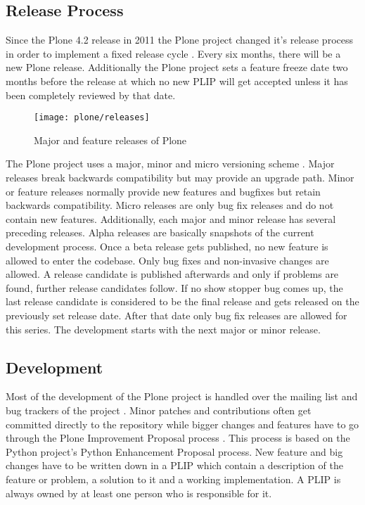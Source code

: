 
\subsection{Release Process} %

Since the Plone 4.2 release in 2011 the Plone project changed it's release
process in order to implement a fixed release cycle
\cite{PloneFixedReleaseCycle}. Every six months, there will be a new Plone
release. Additionally the Plone project sets a feature freeze date two months
before the release at which no new \ac{PLIP} will get accepted unless it has
been completely reviewed by that date.

\begin{figure}[htbp]
  \centering
  \texttt{[image: plone/releases]}
  \caption{Major and feature releases of Plone}
\end{figure}

The Plone project uses a major, minor and micro versioning scheme
\cite{PloneReleaseProcess,PloneCommunityProcesses}. Major releases break
backwards compatibility but may provide an upgrade path. Minor or feature
releases normally provide new features and bugfixes but retain backwards
compatibility. Micro releases are only bug fix releases and do not contain new
features. Additionally, each major and minor release has several preceding
releases. Alpha releases are basically snapshots of the current development
process. Once a beta release gets published, no new feature is allowed to enter
the codebase. Only bug fixes and non-invasive changes are allowed. A release
candidate is published afterwards and only if problems are found, further
release candidates follow. If no show stopper bug comes up, the last release
candidate is considered to be the final release and gets released on the
previously set release date. After that date only bug fix releases are allowed
for this series. The development starts with the next major or minor release.


\subsection{Development} %

Most of the development of the Plone project is handled over the mailing list
and bug trackers of the project \cite{PloneContribute,PloneCommunityProcesses}.
Minor patches and contributions often get committed directly to the repository
while bigger changes and features have to go through the Plone Improvement
Proposal process
\cite{PlonePLIPProcess,PloneCommunityProcesses,PlonePLIPLifecycle}. This
process is based on the Python project's Python Enhancement Proposal process.
New feature and big changes have to be written down in a \ac{PLIP} which
contain a description of the feature or problem, a solution to it and a working
implementation. A \ac{PLIP} is always owned by at least one person who is
responsible for it.

